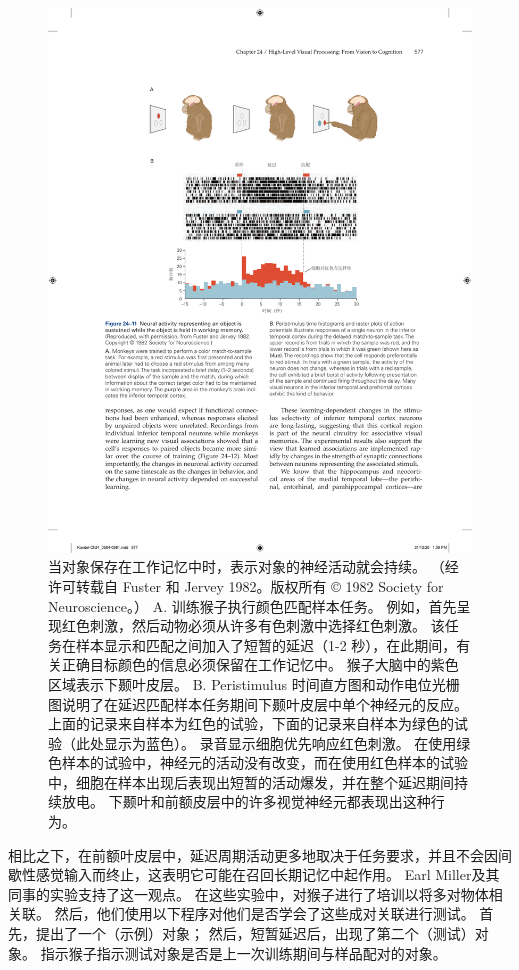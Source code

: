 \begin{figure}[htbp]
	\centering
	\includegraphics[width=0.75\linewidth]{chap24/fig_24_11}
	\caption{当对象保存在工作记忆中时，表示对象的神经活动就会持续。 （经许可转载自 Fuster 和 Jervey 1982。版权所有 © 1982 Society for Neuroscience。） A. 训练猴子执行颜色匹配样本任务。 例如，首先呈现红色刺激，然后动物必须从许多有色刺激中选择红色刺激。 该任务在样本显示和匹配之间加入了短暂的延迟（1-2 秒），在此期间，有关正确目标颜色的信息必须保留在工作记忆中。 猴子大脑中的紫色区域表示下颞叶皮层。 B. Peristimulus 时间直方图和动作电位光栅图说明了在延迟匹配样本任务期间下颞叶皮层中单个神经元的反应。 上面的记录来自样本为红色的试验，下面的记录来自样本为绿色的试验（此处显示为蓝色）。 录音显示细胞优先响应红色刺激。 在使用绿色样本的试验中，神经元的活动没有改变，而在使用红色样本的试验中，细胞在样本出现后表现出短暂的活动爆发，并在整个延迟期间持续放电。 下颞叶和前额皮层中的许多视觉神经元都表现出这种行为。}
	\label{fig:24_11}
\end{figure}


相比之下，在前额叶皮层中，延迟周期活动更多地取决于任务要求，并且不会因间歇性感觉输入而终止，这表明它可能在召回长期记忆中起作用。
Earl Miller及其同事的实验支持了这一观点。
在这些实验中，对猴子进行了培训以将多对物体相关联。 
然后，他们使用以下程序对他们是否学会了这些成对关联进行测试。
首先，提出了一个（示例）对象； 然后，短暂延迟后，出现了第二个（测试）对象。
指示猴子指示测试对象是否是上一次训练期间与样品配对的对象。


